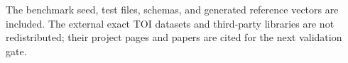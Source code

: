\documentclass[11pt,a4paper,openany]{book}
\begin{document}
The benchmark seed, test files, schemas, and generated reference vectors are included. The external exact TOI datasets and third-party libraries are not redistributed; their project pages and papers are cited for the next validation gate.

\backmatter
\printbibliography[heading=bibintoc,title={References}]
\end{document}
